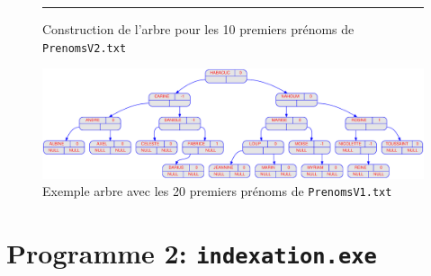 \documentclass{article} %
\begin{document}
\begin{figure}[p]
\begin{center}
     \vline
      \rule{\linewidth}{.5pt} %
   
    
  \end{center}
  
  \caption{Construction de l'arbre pour les 10 premiers prénoms de \texttt{PrenomsV2.txt}}
  \label{fig:prog1_1}
\end{figure}

\begin{figure}[p]
  \begin{center}
    \includegraphics[scale=0.36]{Img_prog1/displayAVL_20.eps}
  \end{center}
  \caption{Exemple arbre avec les 20 premiers prénoms de \texttt{PrenomsV1.txt}}
\end{figure}

\section{Programme 2: \texttt{indexation.exe} \label{sec:prog_2}}
\end{document}
